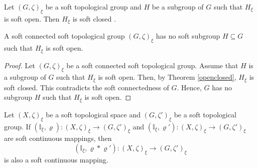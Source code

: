 \documentclass[preprint,12pt]{elsarticle}
\begin{document}
\begin{prop}\label{openclosed}
 Let $(G,\zeta)_\xi$ be a soft topological group and $H$ be a subgroup of $G$ such that $H_\xi$ is soft open. Then $H_\xi$ is soft closed \cite{Hida}.
\end{prop}
\begin{prop}
 A soft connected soft topological group
$(G,\zeta)_\xi$ has no soft subgroup
$H\subseteq G$
such that $H_\xi$ is soft open.
\end{prop}
\begin{proof}
 Let \( (G,\zeta)_\xi \) be a soft connected soft topological group. Assume that \( H \) is a subgroup of \( G \) such that \( H_\xi \) is soft open. Then, by Theorem \ref{openclosed}, \( H_\xi \) is soft closed. This contradicts the soft connectedness of \( G \). Hence, \( G \) has no subgroup \( H \) such that \( H_\xi \) is soft open.
\end{proof}

\begin{prop}\label{productcont}    Let $(X,\zeta)_\xi$ be a soft topological space and $(G,\zeta')_\xi$ be a  soft topological  group. If
\((\mathbb{I}_\xi , \varrho)\colon (X,\zeta)_\xi\to (G,\zeta')_\xi \) and
\((\mathbb{I}_\xi , \varrho')\colon (X,\zeta)_\xi\to (G,\zeta')_\xi\) are soft continuous mappings, then
\[(\mathbb{I}_\xi , \varrho\ast \varrho')\colon (X,\zeta)_\xi\to (G,\zeta')_\xi \] is also a soft continuous mapping.
\end{prop}
\end{document}
